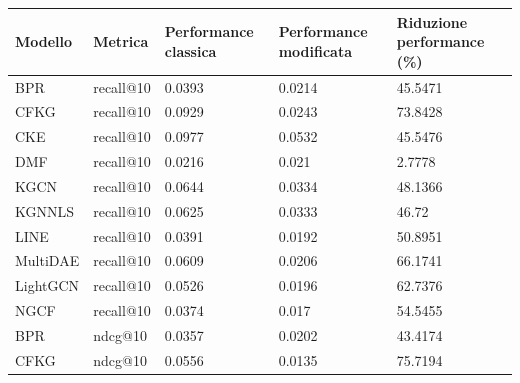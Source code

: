 \begin{table}[H]
    \centering
    \begin{tabular}{|l|l|l|l|l|}
    \hline
    \textbf{Modello} & \textbf{Metrica} & \textbf{Performance classica} & \textbf{Performance modificata} & \textbf{Riduzione performance (\%)} \\ \hline
    BPR              & recall@10         & 0.0393                        & 0.0214                          & 45.5471                               \\ \hline
    CFKG             & recall@10         & 0.0929                        & 0.0243                          & 73.8428                               \\ \hline
    CKE              & recall@10         & 0.0977                        & 0.0532                          & 45.5476                               \\ \hline
    DMF              & recall@10         & 0.0216                        & 0.021                           & 2.7778                                \\ \hline
    KGCN             & recall@10         & 0.0644                        & 0.0334                          & 48.1366                               \\ \hline
    KGNNLS           & recall@10         & 0.0625                        & 0.0333                          & 46.72                                 \\ \hline
    LINE             & recall@10         & 0.0391                        & 0.0192                          & 50.8951                               \\ \hline
    MultiDAE         & recall@10         & 0.0609                        & 0.0206                          & 66.1741                               \\ \hline
    LightGCN         & recall@10         & 0.0526                        & 0.0196                          & 62.7376                               \\ \hline
    NGCF             & recall@10         & 0.0374                        & 0.017                           & 54.5455                               \\ \hline
    BPR              & ndcg@10           & 0.0357                        & 0.0202                          & 43.4174                               \\ \hline
    CFKG             & ndcg@10           & 0.0556                        & 0.0135                          & 75.7194                               \\ \hline

\end{tabular}
\end{table}
